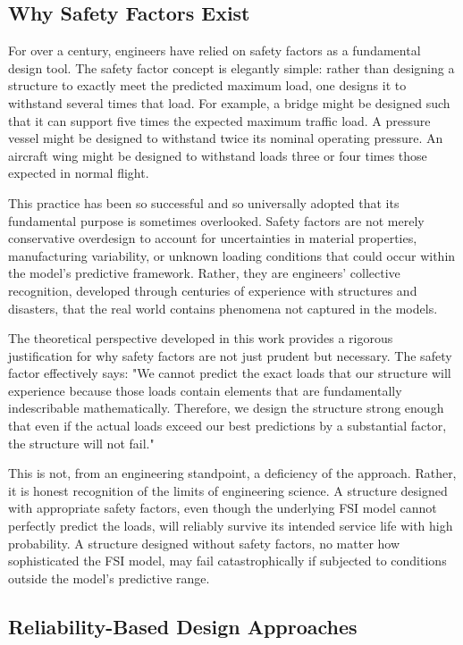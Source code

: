 ﻿\documentclass[a4paper,11pt]{article}
\theoremstyle{definition}
\begin{document}
\subsection{Why Safety Factors Exist}

For over a century, engineers have relied on safety factors as a fundamental design tool. The safety factor concept is elegantly simple: rather than designing a structure to exactly meet the predicted maximum load, one designs it to withstand several times that load. For example, a bridge might be designed such that it can support five times the expected maximum traffic load. A pressure vessel might be designed to withstand twice its nominal operating pressure. An aircraft wing might be designed to withstand loads three or four times those expected in normal flight.

This practice has been so successful and so universally adopted that its fundamental purpose is sometimes overlooked. Safety factors are not merely conservative overdesign to account for uncertainties in material properties, manufacturing variability, or unknown loading conditions that could occur within the model's predictive framework. Rather, they are engineers' collective recognition, developed through centuries of experience with structures and disasters, that the real world contains phenomena not captured in the models.

The theoretical perspective developed in this work provides a rigorous justification for why safety factors are not just prudent but necessary. The safety factor effectively says: "We cannot predict the exact loads that our structure will experience because those loads contain elements that are fundamentally indescribable mathematically. Therefore, we design the structure strong enough that even if the actual loads exceed our best predictions by a substantial factor, the structure will not fail."

This is not, from an engineering standpoint, a deficiency of the approach. Rather, it is honest recognition of the limits of engineering science. A structure designed with appropriate safety factors, even though the underlying FSI model cannot perfectly predict the loads, will reliably survive its intended service life with high probability. A structure designed without safety factors, no matter how sophisticated the FSI model, may fail catastrophically if subjected to conditions outside the model's predictive range.

\subsection{Reliability-Based Design Approaches}
\end{document}
